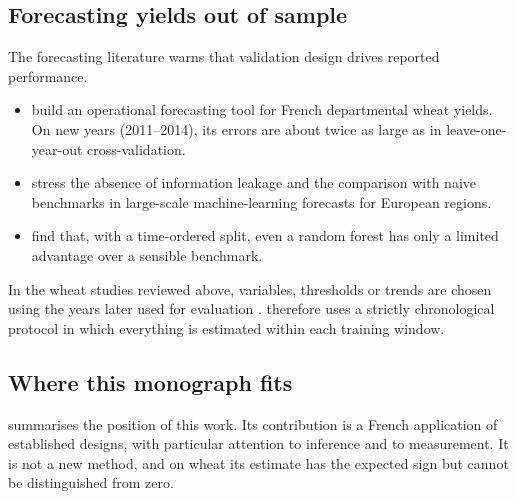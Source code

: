 \subsection{Forecasting yields out of sample}

The forecasting literature warns that validation design drives reported performance.
\begin{itemize}
  \item \textcite{gouache2015} build an operational forecasting tool for French departmental wheat yields. On new years (2011--2014), its errors are about twice as large as in leave-one-year-out cross-validation.
  \item \textcite{paudel2021} stress the absence of information leakage and the comparison with naive benchmarks in large-scale machine-learning forecasts for European regions.
  \item \textcite{morales2023} find that, with a time-ordered split, even a random forest has only a limited advantage over a sensible benchmark.
\end{itemize}
In the wheat studies reviewed above, variables, thresholds or trends are chosen using the years later used for evaluation \parencite{benari2018,noiajunior2025}.  therefore uses a strictly chronological protocol in which everything is estimated within each training window.

\subsection{Where this monograph fits}

 summarises the position of this work. Its contribution is a French application of established designs, with particular attention to inference and to measurement. It is not a new method, and on wheat its estimate has the expected sign but cannot be distinguished from zero.

